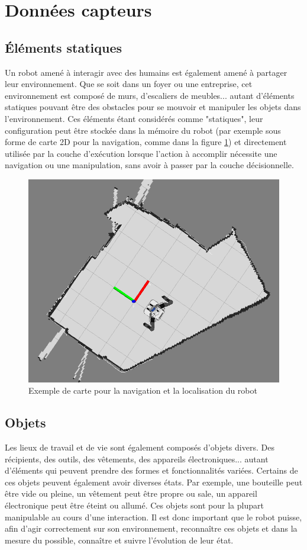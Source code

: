 \documentclass[a4paper,11pt,twoside]{StyleThese}
\begin{document}
\section{Données capteurs}
\label{sec:collecte}
\subsection{Éléments statiques}
Un robot amené à interagir avec des humains est également amené à partager leur environnement. Que se soit dans un foyer ou une entreprise, cet environnement est composé de murs, d'escaliers de meubles... autant d'éléments statiques pouvant être des obstacles pour se mouvoir et manipuler les objets dans l'environnement. Ces éléments étant considérés comme "statiques", leur configuration peut être stockée dans la mémoire du robot (par exemple sous forme de carte 2D pour la navigation, comme dans la figure \ref{fig:map}) et directement utilisée par la couche d'exécution lorsque l'action à accomplir nécessite une navigation ou une manipulation, sans avoir à passer par la couche décisionnelle.

\begin{figure}[ht!]
 \centering
  \includegraphics[width=0.59\linewidth]{./img/Map2d.png} 
  \caption {Exemple de carte pour la navigation et la localisation du robot}
  \label{fig:map}
\end{figure}

\subsection{Objets}
Les lieux de travail et de vie sont également composés d'objets divers. Des récipients, des outils, des vêtements, des appareils électroniques... autant d'éléments qui peuvent prendre des formes et fonctionnalités variées.
Certains de ces objets peuvent également avoir diverses états. Par exemple, une bouteille peut être vide ou pleine, un vêtement peut être propre ou sale, un appareil électronique peut être éteint ou allumé.
Ces objets sont pour la plupart manipulable au cours d'une interaction. Il est donc important que le robot puisse, afin d'agir correctement sur son environnement, reconnaître ces objets et dans la mesure du possible, connaître et suivre l'évolution de leur état.
\end{document}
